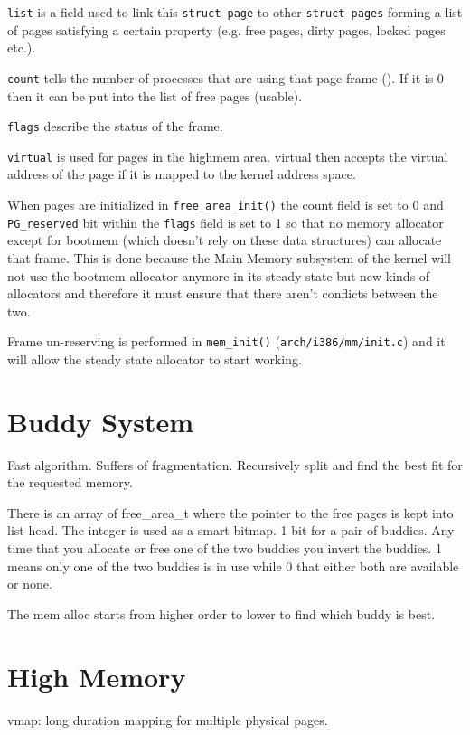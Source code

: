 \documentclass[twoside]{article}
\begin{document}
\texttt{list} is a field used to link this \texttt{struct page} to other
\texttt{struct pages} forming a list of pages satisfying a certain property
(e.g. free pages, dirty pages, locked pages etc.).

\texttt{count} tells the number of processes that are using that page frame (). If
it is 0 then it can be put into the list of free pages (usable).

\texttt{flags} describe the status of the frame. 

\texttt{virtual} is used for pages in the highmem area.
virtual then accepts the virtual address of the page if it is mapped to the
kernel address space.

When pages are initialized in \texttt{free_area_init()} the count field is set
to 0 and \texttt{PG_reserved} bit within the \texttt{flags} field is set to 1
so that no memory allocator except for bootmem (which doesn't rely on these data
structures) can allocate that frame. This is done because the Main Memory
subsystem of the kernel will not use the bootmem allocator anymore in its steady
state but new kinds of allocators and therefore it must ensure that there aren't
conflicts between the two.

Frame un-reserving is performed in \texttt{mem_init()}
(\texttt{arch/i386/mm/init.c}) and it will allow the steady state allocator to
start working.

\section{Buddy System}

Fast algorithm. Suffers of fragmentation. Recursively split and find the best fit for the requested memory. 

There is an array of free\_area\_t where the pointer to the free pages is kept into list head. The integer is used as a smart bitmap. 1 bit for a pair of buddies. Any time that you allocate or free one of the two buddies you invert the buddies. 1 means only one of the two buddies is in use while 0 that either both are available or none. 

The mem alloc starts from higher order to lower to find which buddy is best. 


\section{High Memory}

vmap: long duration mapping for multiple physical pages.
\end{document}
